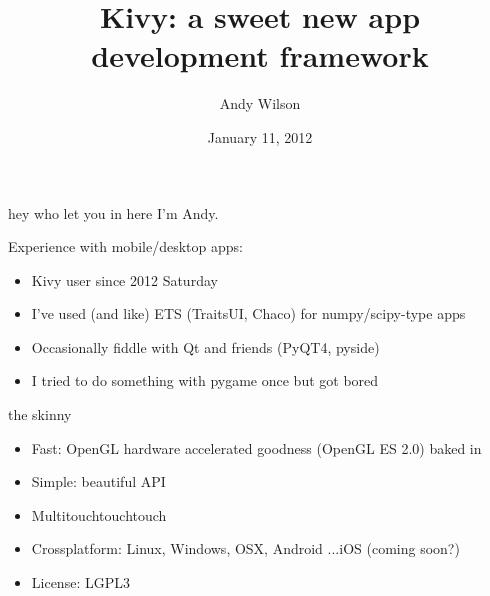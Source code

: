 \documentclass{beamer}
\title[Kivy]{Kivy: a sweet new app development framework}
\author[Andy Wilson]{Andy Wilson}
\date[January 2012]{January 11, 2012}
\begin{document}
\begin{frame}[plain]
  \titlepage
\end{frame}


\begin{frame}{hey who let you in here}
I'm Andy.

Experience with mobile/desktop apps:

\begin{itemize}
  \item Kivy user since 2012
    \pause
    Saturday
    \pause
  \item I've used (and like) ETS (TraitsUI, Chaco) for numpy/scipy-type apps
  \pause
  \item Occasionally fiddle with Qt and friends (PyQT4, pyside)
  \pause
  \item I tried to do something with pygame once but got bored
  \pause
\end{itemize}
\end{frame}


\begin{frame}{the skinny}

\begin{itemize}
  \item Fast: OpenGL hardware accelerated goodness (OpenGL ES 2.0) baked in
  \pause
  \item Simple: beautiful API
  \pause
  \item Multitouchtouchtouch
  \pause
  \item Crossplatform: Linux, Windows, OSX, Android
  \pause
  ...iOS (coming soon?)
  \pause
  \item License: LGPL3
\end{itemize}

\end{frame}
\end{document}
